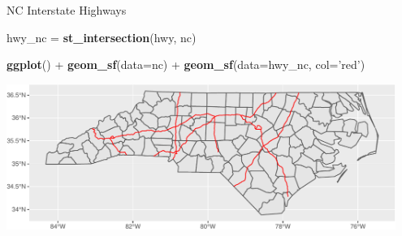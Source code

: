 \documentclass[11pt,ignorenonframetext,]{beamer}
\newenvironment{Shaded}{}{}
\newcommand{\KeywordTok}[1]{\textcolor[rgb]{0.00,0.44,0.13}{\textbf{#1}}}
\newcommand{\DataTypeTok}[1]{\textcolor[rgb]{0.56,0.13,0.00}{#1}}
\newcommand{\StringTok}[1]{\textcolor[rgb]{0.25,0.44,0.63}{#1}}
\newcommand{\OperatorTok}[1]{\textcolor[rgb]{0.40,0.40,0.40}{#1}}
\newcommand{\NormalTok}[1]{#1}
\let\oldShaded\Shaded
\let\endoldShaded\endShaded
\renewenvironment{Shaded}{\footnotesize\begin{spacing}{0.9}\oldShaded}{\endoldShaded\end{spacing}}
\let\oldverbatim\verbatim
\let\endoldverbatim\endverbatim
\newcommand{\scriptoutput}{
  \renewenvironment{Shaded}{\scriptsize\begin{spacing}{0.9}\oldShaded}{\endoldShaded\end{spacing}}
  \renewenvironment{verbatim}{\scriptsize\begin{spacing}{0.9}\oldverbatim}{\endoldverbatim\end{spacing}}
}
\begin{document}
\begin{frame}[fragile,t]{NC Interstate Highways}

\scriptoutput

\begin{Shaded}
\begin{Highlighting}[]
\NormalTok{hwy_nc =}\StringTok{ }\KeywordTok{st_intersection}\NormalTok{(hwy, nc)}

\KeywordTok{ggplot}\NormalTok{() }\OperatorTok{+}\StringTok{ }
\StringTok{  }\KeywordTok{geom_sf}\NormalTok{(}\DataTypeTok{data=}\NormalTok{nc) }\OperatorTok{+}
\StringTok{  }\KeywordTok{geom_sf}\NormalTok{(}\DataTypeTok{data=}\NormalTok{hwy_nc, }\DataTypeTok{col=}\StringTok{'red'}\NormalTok{)}
\end{Highlighting}
\end{Shaded}

\begin{center}\includegraphics[width=0.95\textwidth]{Lec17_files/figure-beamer/unnamed-chunk-27-1} \end{center}

\begin{Shaded}
\begin{Highlighting}[]


\end{Highlighting}
\end{Shaded}
\end{frame}
\end{document}
